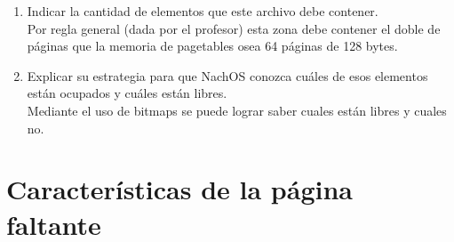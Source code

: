 \documentclass[11pt]{article}
\begin{document}
\begin{enumerate}
\begin{enumerate}
            \item Indicar la cantidad de elementos que este archivo debe contener.\\
            Por regla general (dada por el profesor) esta zona debe contener el doble de páginas que la memoria de pagetables osea 64 páginas de 128 bytes.
            
            \item Explicar su estrategia para que NachOS conozca cuáles de esos elementos están ocupados y cuáles están libres.\\
            Mediante el uso de bitmaps se puede lograr saber cuales están libres y cuales no.
          \end{enumerate}
    \end{enumerate}
  \section{ Características de la página faltante}
\end{document}

